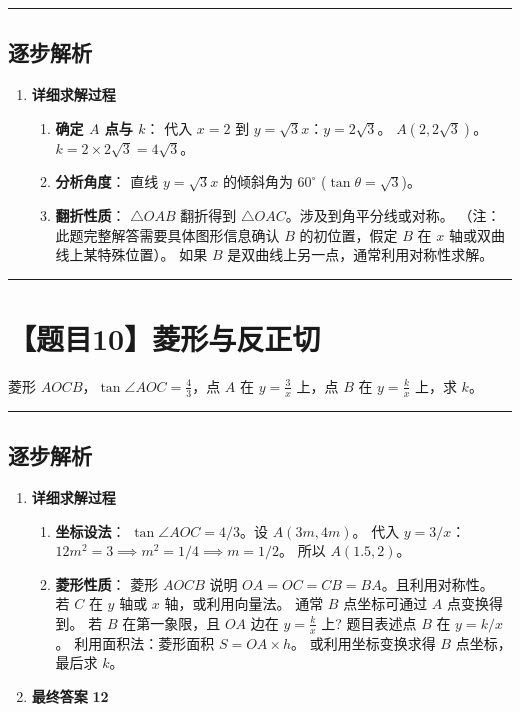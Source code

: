 \documentclass[UTF8]{ctexart}
\newenvironment{redenv}{\color{red}}{}
\newenvironment{detailedanalysis}{%
    \color{red}
    \begin{enumerate}[label=\textbf{第\arabic*步：}, leftmargin=*, align=left, itemsep=1.5ex]
}{%
    \end{enumerate}
}
\newcommand{\problemrule}{\noindent\rule{\textwidth}{1.5pt}\vspace{-0.8em}}
\newcommand{\analysisrule}{\noindent\rule{\textwidth}{0.8pt}\vspace{-0.8em}}
\begin{document}
\begin{redenv}
\analysisrule
\subsection*{逐步解析}

\begin{detailedanalysis}
\item \textbf{详细求解过程}
\begin{enumerate}[label=\textbf{Step \arabic*.}]
    \item \textbf{确定 $A$ 点与 $k$}：
    代入 $x=2$ 到 $y=\sqrt{3}x$：$y = 2\sqrt{3}$。
    $A(2, 2\sqrt{3})$。
    $k = 2 \times 2\sqrt{3} = 4\sqrt{3}$。
    
    \item \textbf{分析角度}：
    直线 $y=\sqrt{3}x$ 的倾斜角为 $60^\circ$ ($\tan \theta = \sqrt{3}$)。
    
    \item \textbf{翻折性质}：
    $\triangle OAB$ 翻折得到 $\triangle OAC$。涉及到角平分线或对称。
    （注：此题完整解答需要具体图形信息确认 $B$ 的初位置，假定 $B$ 在 $x$ 轴或双曲线上某特殊位置）。
    如果 $B$ 是双曲线上另一点，通常利用对称性求解。
\end{enumerate}
\end{detailedanalysis}
\end{redenv}

\problemrule
\section*{【题目10】菱形与反正切}
菱形 $AOCB$，$\tan \angle AOC = \frac{4}{3}$，点 $A$ 在 $y=\frac{3}{x}$ 上，点 $B$ 在 $y=\frac{k}{x}$ 上，求 $k$。

\begin{redenv}
\analysisrule
\subsection*{逐步解析}

\begin{detailedanalysis}
\item \textbf{详细求解过程}
\begin{enumerate}[label=\textbf{Step \arabic*.}]
    \item \textbf{坐标设法}：
    $\tan \angle AOC = 4/3$。设 $A(3m, 4m)$。
    代入 $y=3/x$：$12m^2 = 3 \implies m^2 = 1/4 \implies m = 1/2$。
    所以 $A(1.5, 2)$。
    
    \item \textbf{菱形性质}：
    菱形 $AOCB$ 说明 $OA=OC=CB=BA$。且利用对称性。
    若 $C$ 在 $y$ 轴或 $x$ 轴，或利用向量法。
    通常 $B$ 点坐标可通过 $A$ 点变换得到。
    若 $B$ 在第一象限，且 $OA$ 边在 $y=\frac{k}{x}$ 上? 题目表述点 $B$ 在 $y=k/x$。
    利用面积法：菱形面积 $S = OA \times h$。
    或利用坐标变换求得 $B$ 点坐标，最后求 $k$。
\end{enumerate}

\item \textbf{最终答案}
\textbf{12}
\end{detailedanalysis}
\end{redenv}
\end{document}
